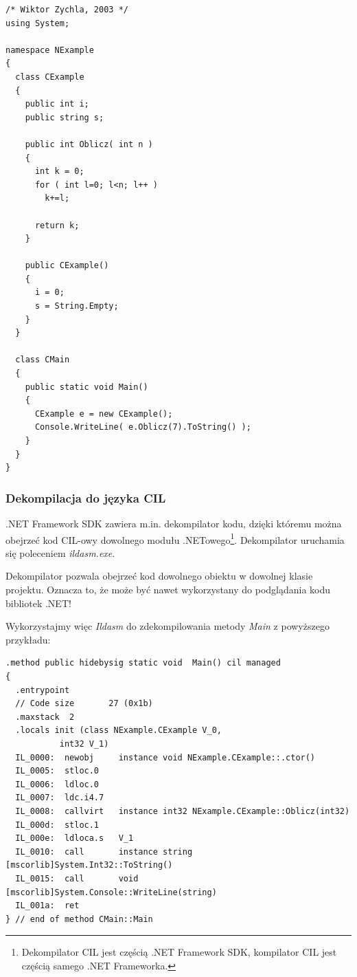 \begin{scriptsize}
\begin{verbatim}
/* Wiktor Zychla, 2003 */
using System;

namespace NExample
{
  class CExample
  {
    public int i;
    public string s;

    public int Oblicz( int n )
    {
      int k = 0;
      for ( int l=0; l<n; l++ )
        k+=l;

      return k;
    }

    public CExample()
    {
      i = 0;
      s = String.Empty;
    }
  }

  class CMain
  {
    public static void Main()
    {
      CExample e = new CExample();
      Console.WriteLine( e.Oblicz(7).ToString() );
    }
  }
}
\end{verbatim}
\end{scriptsize}

\subsubsection{Dekompilacja do języka CIL}

.NET Framework SDK zawiera m.in. dekompilator kodu, dzięki któremu można obejrzeć
kod CIL-owy dowolnego modułu .NETowego\footnote{Dekompilator CIL jest częścią .NET Framework SDK, 
kompilator CIL jest częścią samego .NET Frameworka.}.
Dekompilator uruchamia się poleceniem {\em ildasm.exe}.

Dekompilator pozwala obejrzeć kod dowolnego obiektu w dowolnej klasie projektu. Oznacza to, że może być
nawet wykorzystany do podglądania kodu bibliotek .NET! 

Wykorzystajmy więc {\em Ildasm} do zdekompilowania metody {\em Main} z powyższego
przykładu:

\begin{scriptsize}
\begin{verbatim}
.method public hidebysig static void  Main() cil managed
{
  .entrypoint
  // Code size       27 (0x1b)
  .maxstack  2
  .locals init (class NExample.CExample V_0,
           int32 V_1)
  IL_0000:  newobj     instance void NExample.CExample::.ctor()
  IL_0005:  stloc.0    
  IL_0006:  ldloc.0
  IL_0007:  ldc.i4.7
  IL_0008:  callvirt   instance int32 NExample.CExample::Oblicz(int32)
  IL_000d:  stloc.1
  IL_000e:  ldloca.s   V_1
  IL_0010:  call       instance string [mscorlib]System.Int32::ToString()
  IL_0015:  call       void [mscorlib]System.Console::WriteLine(string)
  IL_001a:  ret
} // end of method CMain::Main
\end{verbatim}
\end{scriptsize}

